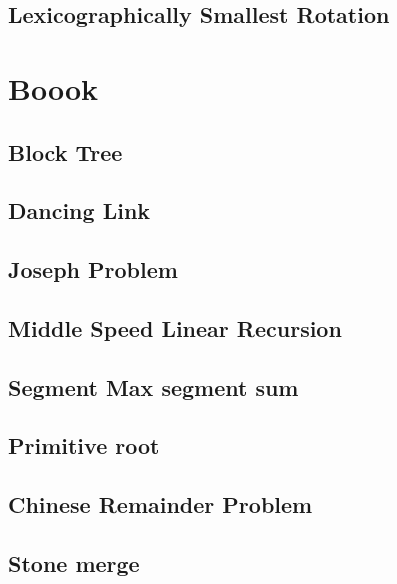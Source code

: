 \documentclass[a4paper,10pt,twocolumn,oneside]{article}
\begin{document}
\subsection{Lexicographically Smallest Rotation}

\section{Boook}

\subsection{Block Tree}


\subsection{Dancing Link}


\subsection{Joseph Problem}


\subsection{Middle Speed Linear Recursion}


\subsection{Segment Max segment sum}


\subsection{Primitive root}


\subsection{Chinese Remainder Problem}


\subsection{Stone merge}

\end{document}
